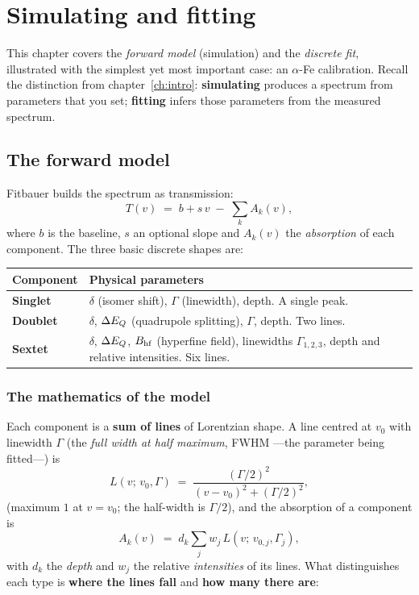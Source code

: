 \chapter{Simulating and fitting}
\label{ch:simular}

This chapter covers the \emph{forward model} (simulation) and the \emph{discrete
fit}, illustrated with the simplest yet most important case: an
$\alpha$-Fe calibration. Recall the distinction from
chapter~\ref{ch:intro}: \textbf{simulating} produces a spectrum from
parameters that you set; \textbf{fitting} infers those parameters from the
measured spectrum.

\section{The forward model}

Fitbauer builds the spectrum as transmission:
\[
  T(v) \;=\; b + s\,v \;-\; \sum_{k} A_k(v),
\]
where $b$ is the baseline, $s$ an optional slope and $A_k(v)$ the
\emph{absorption} of each component. The three basic discrete shapes are:

\begin{center}
\begin{tabular}{@{}lp{}@{}}
\toprule
\textbf{Component} & \textbf{Physical parameters} \\
\midrule
\textbf{Singlet} & $\delta$ (isomer shift), $\Gamma$ (linewidth),
depth. A single peak. \\[3pt]
\textbf{Doublet} & $\delta$, $\Delta E_{Q}$ (quadrupole splitting), $\Gamma$,
depth. Two lines. \\[3pt]
\textbf{Sextet} & $\delta$, $\Delta E_{Q}$, $B_{\mathrm{hf}}$ (hyperfine field), linewidths
$\Gamma_{1,2,3}$, depth and relative intensities. Six lines. \\
\bottomrule
\end{tabular}
\end{center}


\subsection{The mathematics of the model}
\label{sec:modelo-mates}

Each component is a \textbf{sum of lines} of Lorentzian shape. A line
centred at $v_0$ with linewidth $\Gamma$ (the \emph{full width at half
maximum}, FWHM —the parameter being fitted—) is
\[
  L(v;\,v_0,\Gamma) \;=\; \frac{(\Gamma/2)^2}{(v-v_0)^2 + (\Gamma/2)^2},
\]
(maximum $1$ at $v=v_0$; the half-width is $\Gamma/2$), and the absorption of a
component is
\[
  A_k(v) \;=\; d_k \sum_{j} w_j \, L(v;\,v_{0,j},\Gamma_j),
\]
with $d_k$ the \emph{depth} and $w_j$ the relative \emph{intensities} of its
lines. What distinguishes each type is \textbf{where the lines fall} and
\textbf{how many there are}:

